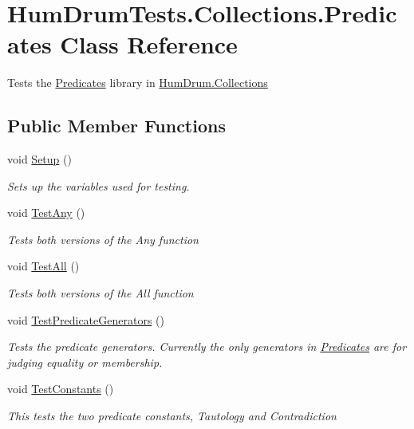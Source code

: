 \hypertarget{classHumDrumTests_1_1Collections_1_1Predicates}{}\section{Hum\+Drum\+Tests.\+Collections.\+Predicates Class Reference}
\label{classHumDrumTests_1_1Collections_1_1Predicates}


Tests the \hyperlink{classHumDrumTests_1_1Collections_1_1Predicates}{Predicates} library in \hyperlink{namespaceHumDrum_1_1Collections}{Hum\+Drum.\+Collections}  


\subsection*{Public Member Functions}
\begin{DoxyCompactItemize}
\item 
void \hyperlink{classHumDrumTests_1_1Collections_1_1Predicates_a80acbc3096ffc25d141eceb13442f22c}{Setup} ()
\begin{DoxyCompactList}\small\item\em Sets up the variables used for testing. \end{DoxyCompactList}\item 
void \hyperlink{classHumDrumTests_1_1Collections_1_1Predicates_a3f3844173c781245d392563cf47fe74a}{Test\+Any} ()
\begin{DoxyCompactList}\small\item\em Tests both versions of the Any function \end{DoxyCompactList}\item 
void \hyperlink{classHumDrumTests_1_1Collections_1_1Predicates_adb5698404a779c6e2dbcc2e1504a7fe8}{Test\+All} ()
\begin{DoxyCompactList}\small\item\em Tests both versions of the All function \end{DoxyCompactList}\item 
void \hyperlink{classHumDrumTests_1_1Collections_1_1Predicates_afa0da270cfbb7fec7579d6744eb07bac}{Test\+Predicate\+Generators} ()
\begin{DoxyCompactList}\small\item\em Tests the predicate generators. Currently the only generators in \hyperlink{classHumDrumTests_1_1Collections_1_1Predicates}{Predicates} are for judging equality or membership. \end{DoxyCompactList}\item 
void \hyperlink{classHumDrumTests_1_1Collections_1_1Predicates_aa1910e9bf3d64229dcfe5e3dfbd54fff}{Test\+Constants} ()
\begin{DoxyCompactList}\small\item\em This tests the two predicate constants, Tautology and Contradiction \end{DoxyCompactList}\end{DoxyCompactItemize}



